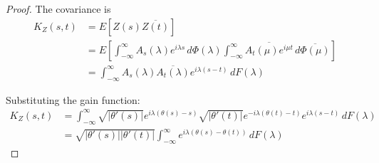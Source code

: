 \documentclass{article}
\begin{document}
\begin{proof}
The covariance is
\begin{align}
K_Z(s,t) &= E[Z(s)\overline{Z(t)}]\\
&= E\left[\int_{-\infty}^{\infty} A_s(\lambda) e^{i\lambda s} \, d\Phi(\lambda) \int_{-\infty}^{\infty} \overline{A_t(\mu) e^{i\mu t}} \, d\overline{\Phi(\mu)}\right]\\
&= \int_{-\infty}^{\infty} A_s(\lambda) \overline{A_t(\lambda)} e^{i\lambda(s-t)} \, dF(\lambda)
\end{align}

Substituting the gain function:
\begin{align}
K_Z(s,t) &= \int_{-\infty}^{\infty} \sqrt{|\theta'(s)|} e^{i\lambda(\theta(s) - s)} \sqrt{|\theta'(t)|} e^{-i\lambda(\theta(t) - t)} e^{i\lambda(s-t)} \, dF(\lambda)\\
&= \sqrt{|\theta'(s)||\theta'(t)|} \int_{-\infty}^{\infty} e^{i\lambda(\theta(s) - \theta(t))} \, dF(\lambda)
\end{align}
\end{proof}
\end{document}

